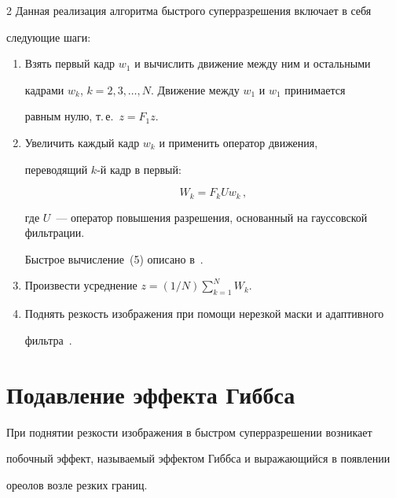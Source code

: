 \begin{multicols}{2}
     Данная реализация алгоритма быстрого суперразрешения включает в себя


следующие шаги:


     \begin{enumerate}[1.]


     \item Взять первый кадр $w_1$ и вычислить движение между ним и остальными


кадрами $w_k$, $k=2, 3, \ldots , N$. Движение между $w_1$ и $w_1$ принимается


равным нулю, т.\,е.\ $z=F_1z$.


     \item Увеличить каждый кадр $w_k$ и применить оператор движения,


переводящий $k$-й кадр в первый:


     \begin{equation}


     W_k=F_k U w_k\,,


     \label{e5nas}


     \end{equation}


где $U$~--- оператор повышения разрешения, основанный на гауссовской фильтрации.


Быст\-рое вычисление~(5) описано в~\cite{17nas}.


     \item Произвести усреднение $z=(1/N)\sum\limits_{k=1}^N W_k$.


     \item Поднять резкость изображения при помощи нерезкой маски и адаптивного


фильтра~\cite{18nas}.


     \end{enumerate}





     \section{Подавление эффекта Гиббса}





     При поднятии резкости изображения в быстром суперразрешении возникает


побочный эффект, называемый эффектом Гиббса и выражающийся в появлении


ореолов возле резких границ.






\end{multicols}
